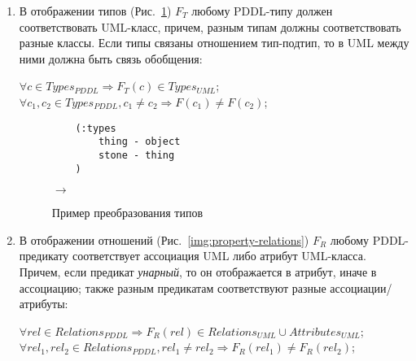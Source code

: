 \documentclass[a4paper,14pt]{extreport}
\begin{document}
    \begin{enumerate}
        \item В отображении типов (Рис.~\ref{img:property-types}) $F_T$ любому PDDL-типу должен соответствовать UML-класс, причем, разным типам должны соответствовать разные классы. Если типы связаны отношением тип-подтип, то в UML между ними должна быть связь обобщения:
    
        \begin{center}
            $\forall c \in Types_{PDDL} \Rightarrow F_T(c) \in Types_{UML}$; \\
            $\forall c_1, c_2 \in Types_{PDDL}, c_1 \neq c_2 \Rightarrow F(c_1) \neq F(c_2)$;
        \end{center}
                 

        
\begin{figure}[!h]
    \hfill
    \begin{minipage}[h]{0.40\linewidth}
        {\raggedright
        \begin{verbatim}
    (:types
        thing - object
        stone - thing
    )
        \end{verbatim} 
        }
    \end{minipage}
    \hfill
    $\rightarrow$
    \hfill
    \begin{minipage}[h]{0.45\linewidth}
    \end{minipage}
    \caption{Пример преобразования типов}
    \label{img:property-types}
\end{figure}
   

        \item В отображении отношений (Рис.~\ref{img:property-relations}) $F_R$ любому PDDL-предикату соответствует ассоциация UML либо атрибут UML-класса. Причем, если предикат \textit{унарный}, то он отображается в атрибут, иначе в ассоциацию; также разным предикатам соответствуют разные ассоциации/атрибуты:
    
        \begin{center}
        $\forall rel \in Relations_{PDDL} \Rightarrow F_R(rel) \in Relations_{UML} \cup Attributes_{UML}$;\\
        $\forall rel_1, rel_2 \in Relations_{PDDL}, rel_1 \neq rel_2 \Rightarrow F_R(rel_1) \neq F_R(rel_2)$; \\
        \end{center}


\end{enumerate}
\end{document}
